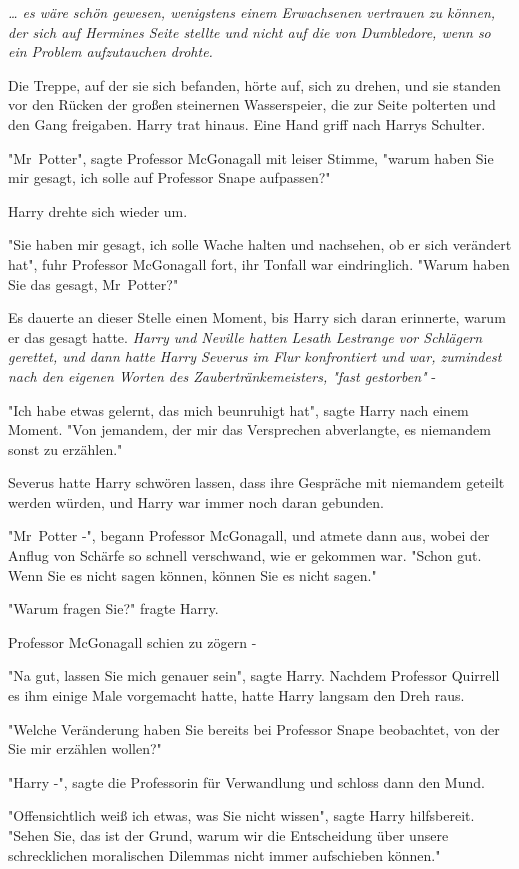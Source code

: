 {\emph{… es wäre schön gewesen, wenigstens einem Erwachsenen vertrauen zu können, der sich auf Hermines Seite stellte und nicht auf die von Dumbledore, wenn so ein Problem aufzutauchen drohte.}

Die Treppe, auf der sie sich befanden, hörte auf, sich zu drehen, und sie standen vor den Rücken der großen steinernen Wasserspeier, die zur Seite polterten und den Gang freigaben. Harry trat hinaus. Eine Hand griff nach Harrys Schulter.

"Mr~Potter", sagte Professor McGonagall mit leiser Stimme, "warum haben Sie mir gesagt, ich solle auf Professor Snape aufpassen?"

Harry drehte sich wieder um.

"Sie haben mir gesagt, ich solle Wache halten und nachsehen, ob er sich verändert hat", fuhr Professor McGonagall fort, ihr Tonfall war eindringlich. "Warum haben Sie das gesagt, Mr~Potter?"

Es dauerte an dieser Stelle einen Moment, bis Harry sich daran erinnerte, warum er das gesagt hatte. \emph{Harry und Neville hatten Lesath Lestrange vor Schlägern gerettet, und dann hatte Harry Severus im Flur konfrontiert und war, zumindest nach den eigenen Worten des Zaubertränkemeisters, "fast gestorben"} -

"Ich habe etwas gelernt, das mich beunruhigt hat", sagte Harry nach einem Moment. "Von jemandem, der mir das Versprechen abverlangte, es niemandem sonst zu erzählen."

Severus hatte Harry schwören lassen, dass ihre Gespräche mit niemandem geteilt werden würden, und Harry war immer noch daran gebunden.

"Mr~Potter -", begann Professor McGonagall, und atmete dann aus, wobei der Anflug von Schärfe so schnell verschwand, wie er gekommen war. "Schon gut. Wenn Sie es nicht sagen können, können Sie es nicht sagen."

"Warum fragen Sie?" fragte Harry.

Professor McGonagall schien zu zögern -

"Na gut, lassen Sie mich genauer sein", sagte Harry. Nachdem Professor Quirrell es ihm einige Male vorgemacht hatte, hatte Harry langsam den Dreh raus.

"Welche Veränderung haben Sie bereits bei Professor Snape beobachtet, von der Sie mir erzählen wollen?"

"Harry -", sagte die Professorin für Verwandlung und schloss dann den Mund.

"Offensichtlich weiß ich etwas, was Sie nicht wissen", sagte Harry hilfsbereit. "Sehen Sie, das ist der Grund, warum wir die Entscheidung über unsere schrecklichen moralischen Dilemmas nicht immer aufschieben können."

}

